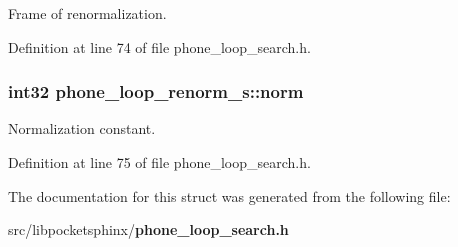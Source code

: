 Frame of renormalization. 



Definition at line 74 of file phone\-\_\-loop\-\_\-search.\-h.

\subsubsection[{norm}]{\setlength{\rightskip}{0pt plus 5cm}int32 phone\-\_\-loop\-\_\-renorm\-\_\-s\-::norm}\label{structphone__loop__renorm__s_a9a76415892efce2e4b53bc5ea6599010}


Normalization constant. 



Definition at line 75 of file phone\-\_\-loop\-\_\-search.\-h.



The documentation for this struct was generated from the following file\-:\begin{DoxyCompactItemize}
\item 
src/libpocketsphinx/{\bf phone\-\_\-loop\-\_\-search.\-h}\end{DoxyCompactItemize}
